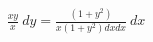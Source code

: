 \documentclass[preview]{standalone}
\begin{document}
\begin{align*}
\frac{x y}{x} \  dy = \frac{\left( 1 + {y}^{2} \right)}{x \left( 1 + {y}^{2} \right) dx dx} \  dx
\end{align*}
\end{document}
